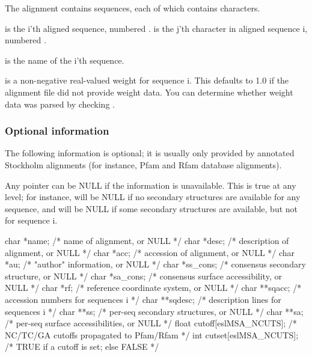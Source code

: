 The alignment contains  sequences, each of which contains
 characters.

 is the i'th aligned sequence, numbered
.  is the j'th character in aligned
sequence i, numbered .

 is the name of the i'th sequence.

 is a non-negative real-valued weight for sequence
i. This defaults to 1.0 if the alignment file did not provide weight
data. You can determine whether weight data was parsed by checking
.

\subsubsection{Optional information}

The following information is optional; it is usually only provided by
annotated Stockholm alignments (for instance, Pfam and Rfam database
alignments). 

Any pointer can be NULL if the information is unavailable. This is
true at any level; for instance,  will be NULL if no
secondary structures are available for any sequence, and 
will be NULL if some secondary structures are available, but not for
sequence i. 

\begin{cchunk}
  char  *name;                  /* name of alignment, or NULL               */
  char  *desc;                  /* description of alignment, or NULL        */
  char  *acc;                   /* accession of alignment, or NULL          */
  char  *au;                    /* "author" information, or NULL            */
  char  *ss_cons;               /* consensus secondary structure, or NULL   */
  char  *sa_cons;               /* consensus surface accessibility, or NULL */
  char  *rf;                    /* reference coordinate system, or NULL     */
  char **sqacc;                 /* accession numbers for sequences i        */
  char **sqdesc;                /* description lines for sequences i        */
  char **ss;                    /* per-seq secondary structures, or NULL    */
  char **sa;                    /* per-seq surface accessibilities, or NULL */
  float  cutoff[eslMSA_NCUTS];  /* NC/TC/GA cutoffs propagated to Pfam/Rfam */
  int    cutset[eslMSA_NCUTS];  /* TRUE if a cutoff is set; else FALSE      */
\end{cchunk}

